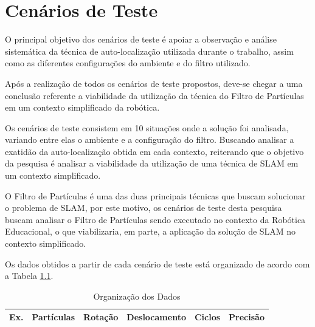 \chapter[Cenários de Teste]{Cenários de Teste}
\label{sec:cenarios_teste}
O principal objetivo dos cenários de teste é apoiar a observação e análise sistemática da técnica de auto-localização utilizada durante o trabalho, assim como as diferentes configurações do ambiente e
do filtro utilizado.

Após a realização de todos os cenários de teste propostos, deve-se chegar a uma conclusão referente a viabilidade da utilização da técnica do Filtro de Partículas em um contexto simplificado da robótica.

Os cenários de teste consistem em 10 situações onde a solução foi analisada, variando entre elas o ambiente e a configuração do filtro. Buscando
analisar a exatidão da auto-localização obtida em cada contexto, reiterando que o objetivo da pesquisa é analisar a viabilidade da utilização
de uma técnica de SLAM em um contexto simplificado.

O Filtro de Partículas é uma das duas principais técnicas que buscam solucionar o problema
de SLAM, por este motivo, os cenários de teste desta pesquisa buscam analisar o Filtro de Partículas sendo executado no contexto da Robótica
Educacional, o que viabilizaria, em parte, a aplicação da solução de SLAM no contexto simplificado.

Os dados obtidos a partir de cada cenário de teste está organizado de acordo com a Tabela \ref{tab:org_dados}.

\begin{table}[H]
  \centering
  \caption{Organização dos Dados}
  \label{tab:org_dados}
  \begin{tabular}{|c|c|c|c|c|c|}
  \hline
  \textbf{Ex.} & \textbf{Partículas} & \textbf{Rotação} & \textbf{Deslocamento} & \textbf{Ciclos} & \textbf{Precisão} \\ \hline
  \end{tabular}
\end{table}

